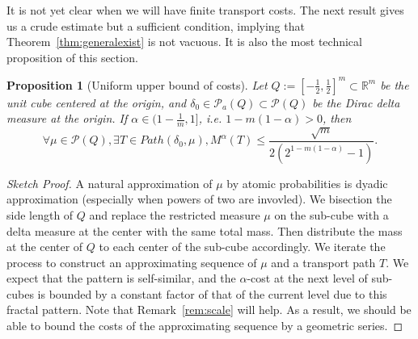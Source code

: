 \documentclass[fleqn]{article}
\newtheorem{prop}[thm]{Proposition}
\theoremstyle{definition}
\theoremstyle{remark}
\renewcommand{\P}{\mathcal{P}} %
\begin{document}
It is not yet clear when we will have finite transport costs. The next result gives us a crude estimate but a sufficient condition, implying that Theorem~\ref{thm:generalexist} is not vacuous. It is also the most technical proposition of this section.
\begin{prop}[Uniform upper bound of costs]\label{prop:upbound}
Let $Q:=\left[-\frac{1}{2},\frac{1}{2}\right]^m \subset \mathbb{R}^m$ be the unit cube centered at the origin, and ${\delta_0 \in\P_a(Q) \subset \P(Q)}$ be the Dirac delta measure at the origin. If $\alpha\in(1-\frac{1}{m},1]$, i.e. $1-m(1-\alpha)>0$, then
$$\forall \mu \in \P(Q), \exists T\in Path(\delta_0,\mu), M^\alpha(T)\le \frac{\sqrt{m}}{2\left(2^{1-m(1-\alpha)}-1\right)}.$$
\end{prop}

\begin{proof}[Sketch Proof]
A natural approximation of $\mu$ by atomic probabilities is dyadic approximation (especially when powers of two are invovled). We bisection the side length of $Q$ and replace the restricted measure $\mu$ on the sub-cube with a delta measure at the center with the same total mass. Then distribute the mass at the center of $Q$ to each center of the sub-cube accordingly. We iterate the process to construct an approximating sequence of $\mu$ and a transport path $T$. We expect that the pattern is self-similar, and the $\alpha$-cost at the next level of sub-cubes is bounded by a constant factor of that of the current level due to this fractal pattern. Note that Remark~\ref{rem:scale} will help. As a result, we should be able to bound the costs of the approximating sequence by a geometric series.
\end{proof}
\end{document}
